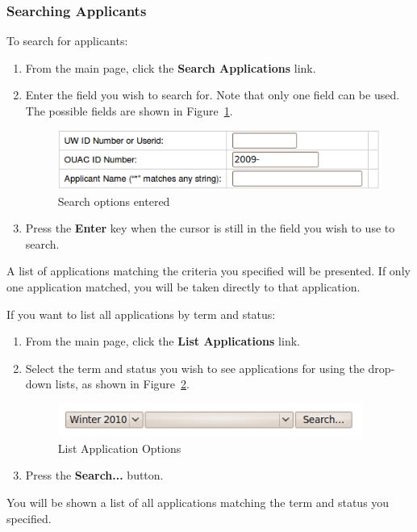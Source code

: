 \documentclass[titlepage]{article}
\begin{document}
\subsubsection{Searching Applicants}
To search for applicants:
\begin{enumerate}
\item From the main page, click the \textbf{\textsf{Search Applications}} link.
\item Enter the field you wish to search for.  Note that only one field can be used.  The possible fields are shown in Figure~\ref{nSearchOptions}.
  \begin{figure}[h!]
    \begin{center}
      \includegraphics[width=13cm]{nsearchoptions.png}
    \end{center}
    \caption{Search options entered}
    \label{nSearchOptions}
  \end{figure}
\item Press the \textbf{\textsf{Enter}} key when the cursor is still in the field you wish to use to search.
\end{enumerate}
A list of applications matching the criteria you specified will be presented.  If only one application matched, you will be taken directly to that application.

If you want to list all applications by term and status:
\begin{enumerate}
\item From the main page, click the \textbf{\textsf{List Applications}} link.
\item Select the term and status you wish to see applications for using the drop-down lists, as shown in Figure~\ref{nListOptions}.
  \begin{figure}[h!]
    \begin{center}
      \includegraphics[width=10cm]{nlistoptions.png}
    \end{center}
    \caption{List Application Options}
    \label{nListOptions}
  \end{figure}
\item Press the \textbf{\textsf{Search...}} button.
\end{enumerate}
You will be shown a list of all applications matching the term and status you specified.
\end{document}

